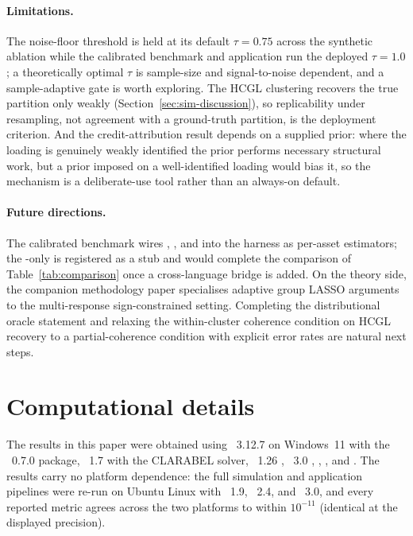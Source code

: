 \documentclass[article]{jss}
\begin{document}
\paragraph{Limitations.}
The noise-floor threshold is held at its default $\tau = 0.75$ across the
synthetic ablation while the calibrated benchmark and application run the
deployed $\tau = 1.0$; a theoretically optimal $\tau$ is sample-size and
signal-to-noise dependent, and a sample-adaptive gate is worth exploring.
The HCGL clustering recovers the true partition only weakly
(Section~\ref{sec:sim-discussion}), so replicability under resampling,
not agreement with a ground-truth partition, is the deployment criterion.
And the credit-attribution result depends on a supplied prior: where the
loading is genuinely weakly identified the prior performs necessary
structural work, but a prior imposed on a well-identified loading would
bias it, so the mechanism is a deliberate-use tool rather than an
always-on default.

\paragraph{Future directions.}
The calibrated benchmark wires , , and
 into the harness as per-asset estimators; the
-only  is registered as a stub and would
complete the comparison of Table~\ref{tab:comparison} once a
cross-language bridge is added. On the theory side, the companion
methodology paper \citep{Sepp+Kastenholz:2026sign} specialises adaptive
group LASSO arguments \citep{Wang+Leng:2008} to the multi-response
sign-constrained setting. Completing the distributional oracle statement
and relaxing the within-cluster coherence condition on HCGL recovery to a
partial-coherence condition with explicit error rates are natural next
steps.



\section*{Computational details}

The results in this paper were obtained using ~3.12.7
on Windows~11 with the ~0.7.0 package,
~1.7 \citep{Diamond+Boyd:2016} with the CLARABEL solver,
~1.26 \citep{Harris+etal:2020},
~3.0 \citep{McKinney:2010}, 
\citep{Virtanen+etal:2020},  \citep{joblib}, and
 \citep{Hunter:2007}. The results carry no platform
dependence: the full simulation and application pipelines were re-run
on Ubuntu Linux with ~1.9, ~2.4, and
~3.0, and every reported metric agrees across the two
platforms to within $10^{-11}$ (identical at the displayed
precision).
\end{document}
